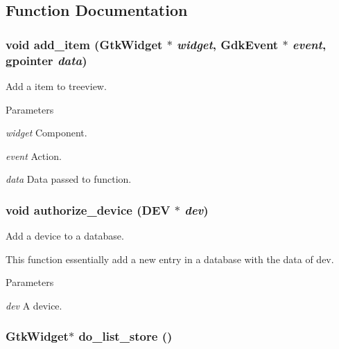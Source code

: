 \subsection{Function Documentation}
\hypertarget{usb-gui_8h_aafc00ee8c683e0173f3e064fcefd10a2}{
\subsubsection[{add\_\-item}]{\setlength{\rightskip}{0pt plus 5cm}void add\_\-item (GtkWidget $\ast$ {\em widget}, \/  GdkEvent $\ast$ {\em event}, \/  gpointer {\em data})}}
\label{usb-gui_8h_aafc00ee8c683e0173f3e064fcefd10a2}


Add a item to treeview. 


\begin{DoxyParams}{Parameters}
\item[{\em widget}]Component. \item[{\em event}]Action. \item[{\em data}]Data passed to function. \end{DoxyParams}
\hypertarget{usb-gui_8h_a36cb198a8cc3b38c2ee2cd9f50b97d67}{
\subsubsection[{authorize\_\-device}]{\setlength{\rightskip}{0pt plus 5cm}void authorize\_\-device ({\bf DEV} $\ast$ {\em dev})}}
\label{usb-gui_8h_a36cb198a8cc3b38c2ee2cd9f50b97d67}


Add a device to a database. 

This function essentially add a new entry in a database with the data of dev. 
\begin{DoxyParams}{Parameters}
\item[{\em dev}]A device. \end{DoxyParams}
\hypertarget{usb-gui_8h_a844df29073de408040bde1e4eea3f474}{
\subsubsection[{do\_\-list\_\-store}]{\setlength{\rightskip}{0pt plus 5cm}GtkWidget$\ast$ do\_\-list\_\-store ()}}
\label{usb-gui_8h_a844df29073de408040bde1e4eea3f474}


